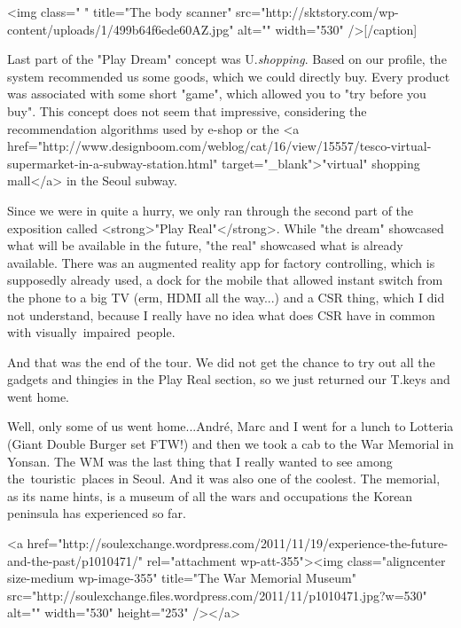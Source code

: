\begin{post}
\begin{content}
[caption id="" align="aligncenter" width="530" caption="The 3D full body scanner"]<img class=" " title="The body scanner" src="http://sktstory.com/wp-content/uploads/1/499b64f6ede60AZ.jpg" alt="" width="530" />[/caption]

Last part of the "Play Dream" concept was U.\textit{shopping}. Based on our profile, the system recommended us some goods, which we could directly buy. Every product was associated with some short "game", which allowed you to "try before you buy". This concept does not seem that impressive, considering the recommendation algorithms used by e-shop or the <a href="http://www.designboom.com/weblog/cat/16/view/15557/tesco-virtual-supermarket-in-a-subway-station.html" target="_blank">"virtual" shopping mall</a> in the Seoul subway.

Since we were in quite a hurry, we only ran through the second part of the exposition called <strong>"Play Real"</strong>. While "the dream" showcased what will be available in the future, "the real" showcased what is already available. There was an augmented reality app for factory controlling, which is supposedly already used, a dock for the mobile that allowed instant switch from the phone to a big TV (erm, HDMI all the way...) and a CSR thing, which I did not understand, because I really have no idea what does CSR have in common with visually impaired people.

And that was the end of the tour. We did not get the chance to try out all the gadgets and thingies in the Play Real section, so we just returned our T.keys and went home.

Well, only some of us went home...André, Marc and I went for a lunch to Lotteria (Giant Double Burger set FTW!) and then we took a cab to the War Memorial in Yonsan. The WM was the last thing that I really wanted to see among the touristic places in Seoul. And it was also one of the coolest. The memorial, as its name hints, is a museum of all the wars and occupations the Korean peninsula has experienced so far.

<a href="http://soulexchange.wordpress.com/2011/11/19/experience-the-future-and-the-past/p1010471/" rel="attachment wp-att-355"><img class="aligncenter size-medium wp-image-355" title="The War Memorial Museum" src="http://soulexchange.files.wordpress.com/2011/11/p1010471.jpg?w=530" alt="" width="530" height="253" /></a>


\end{content}
\end{post}
